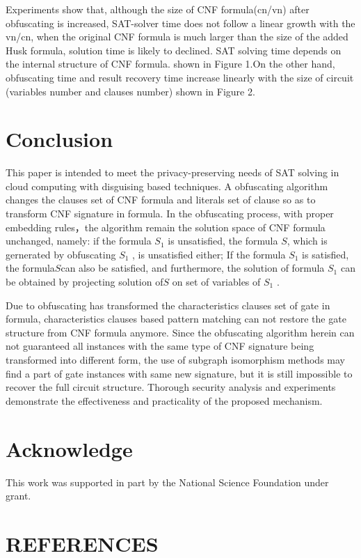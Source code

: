 \documentclass[runningheads,a4paper]{llncs}
\begin{document}
Experiments show that, although the size of CNF formula(cn/vn) after obfuscating is increased, SAT-solver time does not follow a linear growth with the vn/cn, when the original CNF formula is much larger than the size of the added Husk formula, solution time is likely to declined. SAT solving time depends on the internal structure of CNF formula. shown in Figure 1.On the other hand, obfuscating time and result recovery time increase linearly with the size of circuit (variables number and clauses number) shown in Figure 2.
\section{Conclusion} 

This paper is intended to meet the privacy-preserving needs of SAT solving in cloud computing with disguising based techniques. A obfuscating algorithm changes the clauses set of CNF formula and literals set of clause so as to transform CNF signature in formula. In the obfuscating process, with proper embedding rules，the algorithm remain the solution space of CNF formula unchanged, namely: if the formula $S_1$  is unsatisfied, the formula $S$, which is gernerated by obfuscating $S_1$ , is unsatisfied either; If the formula $S_1$  is satisfied, the formula$S$can also be satisfied, and furthermore, the solution of formula $S_1$  can be obtained by projecting solution of$S$ on set of variables of $S_1$  .

Due to obfuscating has transformed the characteristics clauses set of gate in formula, characteristics clauses based pattern matching can not restore the gate structure from CNF formula anymore. Since the obfuscating algorithm herein can not guaranteed all instances with the same type of CNF signature being transformed into different form, the use of subgraph isomorphism methods may find a part of gate instances with same new signature, but it is still impossible to recover the full circuit structure. Thorough security analysis and experiments demonstrate the effectiveness and practicality of the proposed mechanism.
\section{Acknowledge} 

This work was supported in part by the National Science Foundation under grant.

\section{REFERENCES} 
\end{document}
